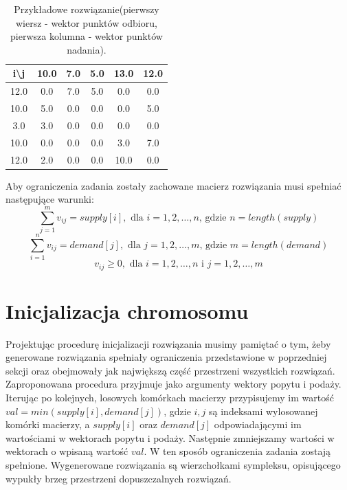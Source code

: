 \begin{table}[h!]
    \begin{center}
        \begin{tabular}{c|ccccc}
            i\textbackslash{j} & 10.0 & 7.0 & 5.0 & 13.0 & 12.0 \\ 
            \hline
            12.0 & 0.0 & 7.0 & 5.0 & 0.0 & 0.0 \\
            10.0 & 5.0 & 0.0 & 0.0 & 0.0 & 5.0 \\
            3.0 & 3.0 & 0.0 & 0.0 & 0.0 & 0.0 \\
            10.0 & 0.0 & 0.0 & 0.0 & 3.0 & 7.0 \\
            12.0 & 2.0 & 0.0 & 0.0 & 10.0 & 0.0 \\
        \end{tabular}
    \end{center}
    \caption{Przykładowe rozwiązanie(pierwszy wiersz - wektor punktów odbioru, pierwsza kolumna - wektor punktów nadania).}
\end{table}

Aby ograniczenia zadania zostały zachowane macierz rozwiązania musi spełniać następujące warunki:
$$\sum_{j=1}^{m} v_{ij} = supply[i], \text{ dla } i = 1, 2, \dots, n \text{, gdzie } n = length(supply)$$
$$\sum_{i=1}^{n} v_{ij} = demand[j], \text{ dla } j = 1, 2, \dots, m \text{, gdzie } m = length(demand)$$
$$v_{ij} \ge 0, \text{ dla } i = 1, 2, \dots, n \text{ i } j = 1, 2, \dots, m$$


\section{Inicjalizacja chromosomu}
Projektując procedurę inicjalizacji rozwiązania musimy pamiętać o tym, żeby generowane rozwiązania spełniały ograniczenia przedstawione 
w poprzedniej sekcji oraz obejmowały jak największą część przestrzeni wszystkich rozwiązań. Zaproponowana procedura przyjmuje jako argumenty 
wektory popytu i podaży. Iterując po kolejnych, losowych komórkach macierzy przypisujemy im wartość $val = min(supply[i], demand[j])$, gdzie 
$i, j$ są indeksami wylosowanej komórki macierzy, a $supply[i]$ oraz $demand[j]$ odpowiadającymi im wartościami w wektorach popytu i podaży. 
Następnie zmniejszamy wartości w wektorach o wpisaną wartość $val$. W ten sposób ograniczenia zadania zostają spełnione. Wygenerowane rozwiązania są 
wierzchołkami sympleksu, opisującego wypukły brzeg przestrzeni dopuszczalnych rozwiązań.

